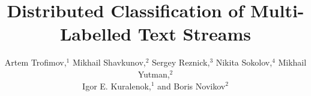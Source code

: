 \documentclass[sigconf]{acmart}
\theoremstyle{remark}
\begin{document}

\title {Distributed Classification of Multi-Labelled Text Streams}

\author{Artem Trofimov,$^ {1}$    Mikhail Shavkunov,$^2$    Sergey Reznick,$^3$     Nikita Sokolov,$^{4}$   Mikhail Yutman,$^2$ \\   Igor E. Kuralenok,$^1$    and  Boris Novikov$^ {2}$ }
\end{document}
